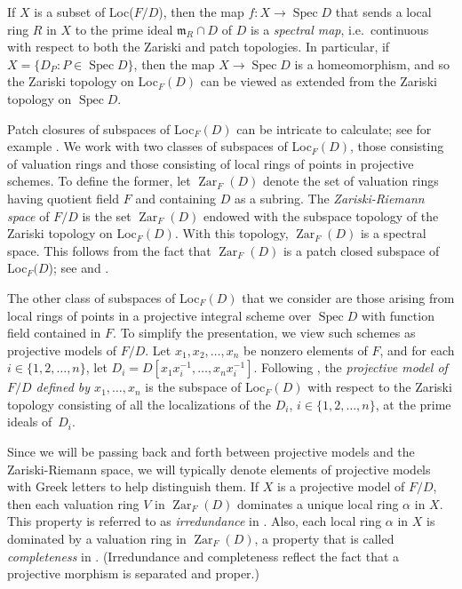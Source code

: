 \documentclass[preprint, 11pt,nonatbib]{elsarticle}
\DeclareMathOperator{\Spec}{Spec}
\DeclareMathOperator{\Zar}{Zar}
\theoremstyle{definition}
\numberwithin{theorem}{section}
\begin{document}
If $X$ is a subset of Loc($F/D$), 
 then the map $f:X \rightarrow \Spec  D $ that sends a local ring $R$ in $X$ to the prime ideal ${\mathfrak{m}}_R \cap D$ of $D$ is a \emph{spectral map}, i.e.\ continuous with respect to both the Zariski and patch topologies.
 In particular, if $X = \{D_P:P \in \Spec D\}$, then the map $X \rightarrow \Spec D $ is a homeomorphism, and so the Zariski topology on Loc$_F(D)$  can be viewed as extended from the Zariski topology on $\Spec D$.  
 
 
 

Patch closures of subspaces of Loc$_F(D)$ can be intricate to calculate; see for example 
\cite[Section~2]{MR3565813}.  
We work with two classes of subspaces of Loc$_F(D)$, those consisting of valuation rings and those consisting of local rings of points in projective schemes. 
To define the former, 
let  $\Zar_F(D)$ denote the set of valuation rings having quotient field $F$ and containing $D$ as a subring. The {\it Zariski-Riemann space} of $F/D$ is the set $\Zar_F(D)$ endowed with the subspace topology of the Zariski topology on Loc$_F(D)$. With this topology, $\Zar_F(D)$ is a spectral space. This 
follows   from the fact that $\Zar_F(D)$ is a patch closed subspace  of Loc$_F(D$); see \cite[Example 2.2(8)]{MR3565813} and \cite{MR0389876}. 

The other class of subspaces of Loc$_F(D)$ that we consider are those arising from  local rings of points in a projective integral scheme over $\Spec D $ with function field contained in $F$. To simplify the presentation, we view such schemes as projective models of $F/D$. Let $x_1,x_2,\ldots,x_n$ be nonzero elements of $ F$, and for each $i \in \{1,2,\ldots,n\}$, let $D_i = D[x_1x_i^{-1},\ldots,x_nx_i^{-1}]$.  Following \cite[p.~119]{MR0389876}, the {\it projective model of $F/D$ defined by $x_1,\ldots,x_n$} is the subspace of Loc$_F(D)$ with respect to the Zariski topology  consisting of all the localizations of the $D_i$, $i \in \{1,2,\ldots,n\}$, at the prime ideals of~$D_i$. 

Since we will be passing back and forth between projective models and the Zariski-Riemann space, we will typically denote elements of projective models with Greek letters to help distinguish them. 
If $X$ is a  projective model  of $F/D$, then each valuation ring $V$ in $\Zar_F(D)$ {dominates} a unique local ring $\alpha$ in $X$. This property is referred to as {\it irredundance} in \cite[p.~115]{MR0389876}. Also, each local ring $\alpha$ in $X$ is dominated by a valuation ring in $\Zar_F(D)$, a property that is called {\it completeness} in  \cite[p.~127]{MR0389876}. (Irredundance and completeness reflect   the fact that a projective morphism is separated and proper.) 
\end{document}
